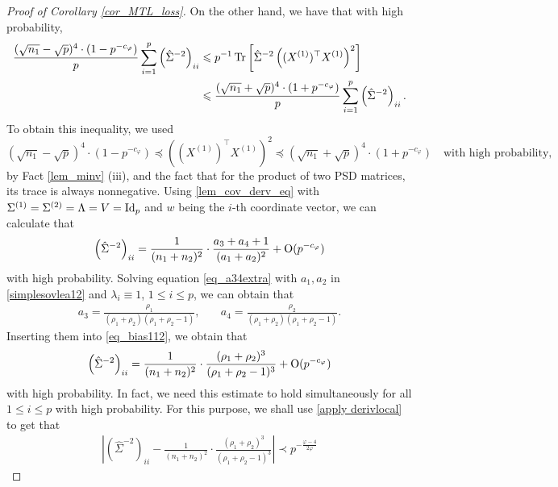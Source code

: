 \begin{proof}[Proof of Corollary \ref{cor_MTL_loss}]
On the other hand, we have that with high probability,
\begin{align}
 \frac{(\sqrt{n_1}-\sqrt{p})^4 \cdot (1- p^{-c_\varphi})}{p}\sum_{i=1}^p \left(\hat \Sigma^{-2}\right)_{ii}  &\leqslant {p}^{-1}\operatorname{Tr}\left[\hat\Sigma^{-2} \left((X^{(1)})^\top X^{(1)} \right)^2\right] \label{eq_bias111}\\ 
 &\leqslant \frac{(\sqrt{n_1}+\sqrt{p})^4 \cdot (1+ p^{-c_\varphi})}{p}\sum_{i=1}^p \left(\hat\Sigma^{-2}\right)_{ii} .\nonumber
\end{align}
To obtain this inequality, we used  
$$ (\sqrt{n_1}-\sqrt{p})^4 \cdot (1-p^{-c_\varphi}) \preceq \left((X^{(1)})^\top X^{(1)} \right)^2 \preceq (\sqrt{n_1}+\sqrt{p})^4 \cdot (1+ p^{-c_\varphi}) \quad \text{with high probability},$$
by Fact \ref{lem_minv} (iii), and the fact that for the product of two PSD matrices, its trace is always nonnegative.
Using \eqref{lem_cov_derv_eq} with $\Sigma^{(1)}=\Sigma^{(2)}=\Lambda=V=\operatorname{Id}_p$ and $w$ being the $i$-th coordinate vector, we can calculate that 
\begin{align}\label{eq_bias112}
 \left(\hat\Sigma^{-2}\right)_{ii} = \frac{1}{(n_1+n_2)^2}\cdot \frac{a_3+a_4+1}{(a_1+a_2)^2} +\operatorname{O}(p^{-c_\varphi})
\end{align}
with high probability. Solving equation \eqref{eq_a34extra} with $a_1, a_2$ in \eqref{simplesovlea12} and $\lambda_i\equiv 1$, $1\le i\le p$, we can obtain that
	\begin{align}
		a_3 = \frac{\rho_1}{(\rho_1 + \rho_2)(\rho_1 + \rho_2 - 1)}, \quad
		&  a_4 = \frac{\rho_2}{(\rho_1 + \rho_2)(\rho_1 + \rho_2 - 1)}.\label{simplesovlea34}
	\end{align}
Inserting them into \eqref{eq_bias112}, we obtain that 
\begin{align*}%
 \left(\hat\Sigma^{-2}\right)_{ii} = \frac{1}{(n_1+n_2)^2}\cdot \frac{(\rho_1+\rho_2)^3}{(\rho_1+\rho_2-1)^3} +\OO(p^{-c_\varphi})
\end{align*}
with high probability. In fact, we need this estimate to hold simultaneously for all $1\le i \le p$ with high probability. For this purpose, we shall use \eqref{apply derivlocal} to get that 
\begin{align*}%
\left| \left(\hat\Sigma^{-2}\right)_{ii} - \frac{1}{(n_1+n_2)^2}\cdot \frac{(\rho_1+\rho_2)^3}{(\rho_1+\rho_2-1)^3}\right|\prec p^{-\frac{\varphi-4}{2\varphi}}

\end{align*}
\end{proof}
